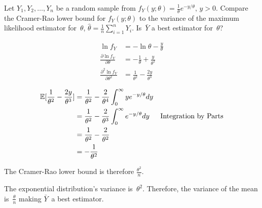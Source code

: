 \begin{problem}
   Let ${Y_1,Y_2,\ldots,Y_n}$ be a random sample from ${f_{Y}(y;\theta) = \frac{1}{\theta} e^{-y/\theta}\text{, } y > 0}$.  Compare the Cramer-Rao lower bound for ${f_{Y}(y;\theta)}$ to the variance of the maximum likelihood estimator for~$\theta$, ${\hat{\theta} = \frac{1}{n}\sum_{i=1}^{n}Y_i}$. Is~$\bar{Y}$ a best estimator for~$\theta$?
\end{problem}

\begin{align}
  \ln f_Y &= -\ln\theta - \frac{y}{\theta} \\
  \frac{\partial \ln f_Y}{\partial \theta} &= -\frac{1}{\theta} + \frac{y}{\theta^2} \\
  \frac{\partial^{2} \ln f_Y}{\partial \theta^{2}} &= \frac{1}{\theta^2} - \frac{2y}{\theta^3}
\end{align}

\begin{align}
  \mathbb{E}\lbrack\frac{1}{\theta^2} - \frac{2y}{\theta^3}\rbrack &= \frac{1}{\theta^2} - \frac{2}{\theta^4} \int_{0}^{\infty} ye^{-y/\theta} dy \\
                                                    &= \frac{1}{\theta^2} - \frac{2}{\theta^3} \int_{0}^{\infty} e^{-y/\theta} dy  & \text{Integration by Parts} \\
                                                    &= \frac{1}{\theta^2} - \frac{2}{\theta^2} \\
                                                    &= - \frac{1}{\theta^2}
\end{align}

The Cramer-Rao lower bound is therefore ${\boxed{\frac{\theta^2}{n}}}$.

The exponential distribution's variance is~$\theta^2$.  Therefore, the variance of the mean is~$\frac{\theta}{n}$ making $\bar{Y}$~a best estimator.
